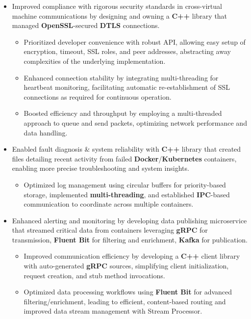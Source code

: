 \documentclass[a4paper]{article}
\begin{document}
\begin{itemize}
	\item Improved compliance with rigorous security standards in cross-virtual machine communications by designing and owning a \textbf{C++} library that managed \textbf{OpenSSL}-secured \textbf{DTLS} connections.
        \begin{itemize}
	        \item Prioritized developer convenience with robust API, allowing easy setup of encryption, timeout, SSL roles, and peer addresses, abstracting away complexities of the underlying implementation.
	        \item Enhanced connection stability by integrating multi-threading for heartbeat monitoring, facilitating automatic re-establishment of SSL connections as required for continuous operation.
	        \item Boosted efficiency and throughput by employing a multi-threaded approach to queue and send packets, optimizing network performance and data handling.
        \end{itemize}
	\item Enabled fault diagnosis \& system reliability with \textbf{C++} library that created files detailing recent activity from failed \textbf{Docker}/\textbf{Kubernetes} containers, enabling more precise troubleshooting and system insights.
        \begin{itemize}
	        \item Optimized log management using circular buffers for priority-based storage, implemented \textbf{multi-threading}, and established \textbf{IPC}-based communication to coordinate across multiple containers.
        \end{itemize}
	\item Enhanced alerting and monitoring by developing data publishing microservice that streamed critical data from containers leveraging \textbf{gRPC} for transmission, \textbf{Fluent Bit} for filtering and enrichment, \textbf{Kafka} for publication.
        \begin{itemize}
	        \item Improved communication efficiency by developing a \textbf{C++} client library with auto-generated \textbf{gRPC} sources, simplifying client initialization, request creation, and stub method invocations.
	        \item Optimized data processing workflows using \textbf{Fluent Bit} for advanced filtering/enrichment, leading to efficient, content-based routing and improved data stream management with Stream Processor.

\end{itemize}
\end{itemize}
\end{document}
